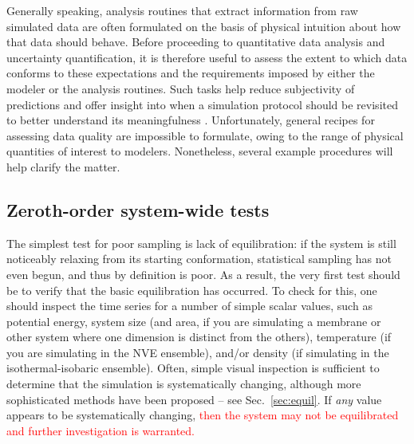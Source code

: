 Generally speaking, analysis routines that extract information from raw simulated data are often formulated on the basis of physical intuition about how that data should behave.  Before proceeding to quantitative data analysis and uncertainty quantification, it is therefore useful to assess the extent to which data conforms to these expectations and the requirements imposed by either the modeler or the analysis routines.  Such tasks help reduce subjectivity of predictions and offer insight into when a simulation protocol should be revisited to better understand its meaningfulness \cite{patrone1}.  Unfortunately, general recipes for assessing data quality are impossible to formulate, owing to the range of physical quantities of interest to modelers.  Nonetheless, several example procedures will help clarify the matter.

\subsection{Zeroth-order system-wide tests}

The simplest test for poor sampling is lack of equilibration: if the system is still noticeably relaxing from its starting conformation, statistical sampling has not even begun, and thus by definition is poor.  As a result, the very first test should be to verify that the basic equilibration has occurred.  To check for this, one should inspect the time series for a number of simple scalar values, such as potential energy, system size (and area, if you are simulating a membrane or other system where one dimension is distinct from the others), temperature (if you are simulating in the NVE ensemble), and/or density (if simulating in the isothermal-isobaric ensemble).  Often, simple visual inspection is sufficient to determine that the simulation is systematically changing, although more sophisticated methods have been proposed -- see Sec.\ \ref{sec:equil}.  If \emph{any} value appears to be systematically changing, %
\textcolor{red}{then the system may not be equilibrated and further investigation is warranted.}  

